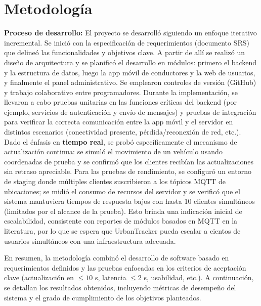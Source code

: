 \section{Metodología}
\textbf{Proceso de desarrollo:} El proyecto se desarrolló siguiendo un enfoque iterativo incremental. Se inició con la especificación de requerimientos (documento SRS) que delineó las funcionalidades y objetivos clave. A partir de allí se realizó un diseño de arquitectura y se planificó el desarrollo en módulos: primero el backend y la estructura de datos, luego la app móvil de conductores y la web de usuarios, y finalmente el panel administrativo. Se emplearon controles de versión (GitHub) y trabajo colaborativo entre programadores. Durante la implementación, se llevaron a cabo pruebas unitarias en las funciones críticas del backend (por ejemplo, servicios de autenticación y envío de mensajes) y pruebas de integración para verificar la correcta comunicación entre la app móvil y el servidor en distintos escenarios (conectividad presente, pérdida/reconexión de red, etc.). Dado el énfasis en \textbf{tiempo real}, se probó específicamente el mecanismo de actualización continua: se simuló el movimiento de un vehículo usando coordenadas de prueba y se confirmó que los clientes recibían las actualizaciones sin retraso apreciable. Para las pruebas de rendimiento, se configuró un entorno de staging donde múltiples clientes suscribieron a los tópicos MQTT de ubicaciones; se midió el consumo de recursos del servidor y se verificó que el sistema mantuviera tiempos de respuesta bajos con hasta 10 clientes simultáneos (limitados por el alcance de la prueba). Esto brinda una indicación inicial de escalabilidad, consistente con reportes de módulos basados en MQTT en la literatura\cite{ortiz2022smolcomm}, por lo que se espera que UrbanTracker pueda escalar a cientos de usuarios simultáneos con una infraestructura adecuada.

En resumen, la metodología combinó el desarrollo de software basado en requerimientos definidos y las pruebas enfocadas en los criterios de aceptación clave (actualización en $\leq 10$ s, latencia $\leq 2$ s, usabilidad, etc.). A continuación, se detallan los resultados obtenidos, incluyendo métricas de desempeño del sistema y el grado de cumplimiento de los objetivos planteados.

